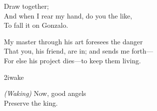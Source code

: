 \begin{verse_speech}[Antonio] 
Draw together;\\
And when I rear my hand, do you the like,\\
To fall it on Gonzalo.
\end{verse_speech}





\begin{verse_speech}[Ariel] 
My master through his art foresees the danger\\
That you, his friend, are in; and sends me forth—\\
For else his project dies—to keep them living.


\begin{song}
\end{song}


\end{verse_speech}


\begin{pictures} %
	
\begin{bwbigpic}
	[\picwidth]
	{2iwake}
	{}
\end{bwbigpic}

\end{pictures}



\begin{verse_speech}[Gonzalo] 
\textit{(Waking)} Now, good angels\\
Preserve the king.\\
\end{verse_speech}


